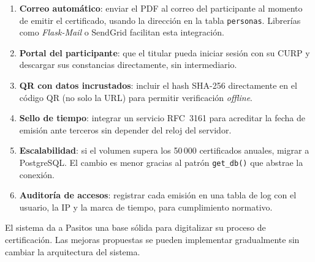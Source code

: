 \documentclass[11pt,letterpaper]{article}
\begin{document}
\begin{enumerate}
  \item \textbf{Correo autom\'atico}: enviar el PDF al correo del participante al
        momento de emitir el certificado, usando la direcci\'on en la tabla
        \texttt{personas}. Librer\'ias como \textit{Flask-Mail} o SendGrid facilitan
        esta integraci\'on.

  \item \textbf{Portal del participante}: que el titular pueda iniciar sesi\'on con
        su CURP y descargar sus constancias directamente, sin intermediario.

  \item \textbf{QR con datos incrustados}: incluir el hash SHA-256 directamente en
        el c\'odigo QR (no solo la URL) para permitir verificaci\'on
        \textit{offline}.

  \item \textbf{Sello de tiempo}: integrar un servicio RFC~3161 para acreditar la
        fecha de emisi\'on ante terceros sin depender del reloj del servidor.

  \item \textbf{Escalabilidad}: si el volumen supera los 50\,000 certificados
        anuales, migrar a PostgreSQL. El cambio es menor gracias al patr\'on
        \texttt{get\_db()} que abstrae la conexi\'on.

  \item \textbf{Auditor\'ia de accesos}: registrar cada emisi\'on en una tabla de
        log con el usuario, la IP y la marca de tiempo, para cumplimiento normativo.
\end{enumerate}

El sistema da a Pasitos una base s\'olida para digitalizar su proceso de
certificaci\'on. Las mejoras propuestas se pueden implementar gradualmente sin
cambiar la arquitectura del sistema.
\end{document}

